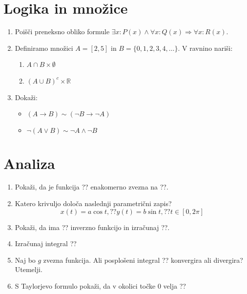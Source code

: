 \documentclass[a4paper,12pt]{article}
\begin{document}

\section*{Logika in množice}

\begin{enumerate}
\item
Poišči preneksno obliko formule \(\exists x : P(x) \wedge \forall x : Q(x) \Rightarrow \forall x : R(x).\)

\item
Definiramo množici \(A = [2,5]\) in \(B = \{0,1,2,3,4,\dots\}\).
V ravnino nariši:
\begin{enumerate}
\item \(A \cap B \times \emptyset\)
\item \((A \cup B)^c \times \mathbb{R}\)
\end{enumerate}

\item
Dokaži:
\begin{itemize}
\item \((A \rightarrow B) \sim (\neg B \rightarrow \neg A)\)
\item \(\neg (A \vee B) \sim \neg A \wedge \neg B\)
\end{itemize}
\end{enumerate}

\section*{Analiza}

\begin{enumerate}
\item
Pokaži, da je funkcija ?? enakomerno zvezna na ??.

\item
Katero krivuljo določa naslednji parametrični zapis?
\[
x(t) = a \cos t, ?? %
y(t) = b \sin t, ?? %
t \in [0, 2 \pi]
\]

\item
Pokaži, da ima ?? inverzno funkcijo in izračunaj ??.

\item
Izračunaj integral
??

\item
Naj bo \(g\) zvezna funkcija. Ali posplošeni integral
??
konvergira ali divergira? Utemelji.

\item
S Taylorjevo formulo pokaži, da v okolici točke \(0\) velja
??
\end{enumerate}
\end{document}

